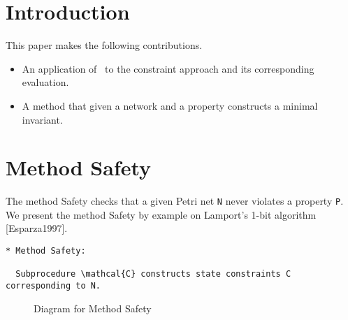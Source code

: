 \documentclass{llncs}
\begin{document}
\section{Introduction}

This paper makes the following contributions.
\begin{itemize}
\item An application of \zthree\ to the constraint approach and its
  corresponding evaluation.
\item A method that given a network and a property constructs a
  minimal invariant.
\end{itemize}




\newpage
\section{Method Safety}

The method Safety checks that a given Petri net \verb=N= never violates a property \verb=P=.
We present the method Safety by example on Lamport's 1-bit algorithm [Esparza1997].

\begin{verbatim}
* Method Safety:

  Subprocedure \mathcal{C} constructs state constraints C corresponding to N.
\end{verbatim}

\begin{figure}
\begin{center}
\end{center}
\caption{Diagram for Method Safety}
\label{fig:method-safety-pseudocode}
\end{figure}
\end{document}
